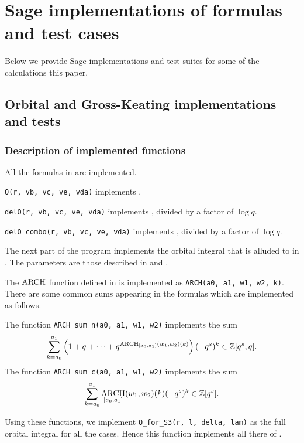 \section{Sage implementations of formulas and test cases}
Below we provide Sage implementations and test suites
for some of the calculations this paper.

\subsection{Orbital and Gross-Keating implementations and tests}
\subsubsection{Description of implemented functions}
All the formulas in  are implemented.
\begin{itemize}
  \ii \texttt{O(r, vb, vc, ve, vda)}
  implements .

  \ii \texttt{delO(r, vb, vc, ve, vda)}
  implements ,
  divided by a factor of $\log q$.

  \ii \texttt{delO\_combo(r, vb, vc, ve, vda)}
  implements ,
  divided by a factor of $\log q$.
\end{itemize}

The next part of the program implements the orbital integral
that is alluded to in .
The parameters are those described in  and .
\begin{itemize}
  \ii The $\operatorname*{ARCH}$ function defined in  is implemented
  as \texttt{ARCH(a0, a1, w1, w2, k)}.
  \ii There are some common sums appearing in the formulas
  which are implemented as follows.
  \begin{itemize}
    \ii The function \texttt{ARCH\_sum\_n(a0, a1, w1, w2)} implements the sum
    \[ \sum_{k=a_0}^{a_1} \left( 1 + q + \dots
      + q^{\operatorname*{ARCH}_{[a_0, a_1]}(w_1, w_2)(k)} \right) (-q^s)^k \in \mathbb Z[q^s, q]. \]
    \ii The function \texttt{ARCH\_sum\_c(a0, a1, w1, w2)} implements the sum
    \[ \sum_{k=a_0}^{a_1} \operatorname*{ARCH}_{[a_0, a_1]}(w_1, w_2)(k) (-q^s)^k \in \mathbb Z[q^s]. \]
  \end{itemize}
  \ii Using these functions, we implement \texttt{O\_for\_S3(r, l, delta, lam)}
  as the full orbital integral for all the cases.
  Hence this function implements all there of
  .
\end{itemize}

